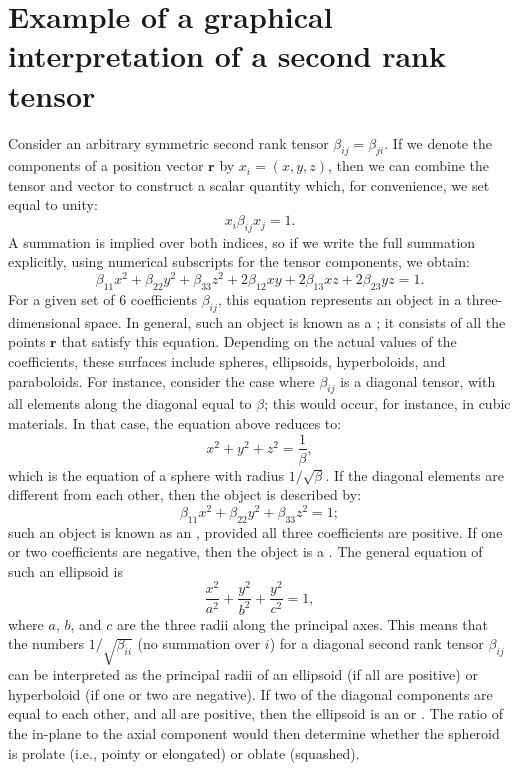 \section{Example of a graphical interpretation of a second rank tensor}\label{\chabbr:sec:tensorgraph}

Consider an arbitrary symmetric second rank tensor $\beta_{ij}=\beta_{ji}$.  If we denote the components of a position vector $\mathbf{r}$ by $x_i=(x,y,z)$, then we can combine the tensor and vector to construct a scalar quantity which, for convenience, we set equal to unity:
\[
	x_i\beta_{ij}x_j = 1.
\]
A summation is implied over both indices, so if we write the full summation explicitly, using numerical subscripts for the tensor components, we obtain:
\[
	\beta_{11}x^2+\beta_{22}y^2+\beta_{33}z^2 + 2\beta_{12}xy+2\beta_{13}xz+2\beta_{23}yz=1.
\]
For a given set of $6$ coefficients $\beta_{ij}$, this equation represents an object in a three-dimensional space.  In general, such an object is known as a ; it consists of all the points $\mathbf{r}$  that satisfy this equation.  Depending on the actual values of the coefficients, these surfaces include spheres, ellipsoids, hyperboloids, and paraboloids.  For instance, consider the case where $\beta_{ij}$ is a diagonal tensor, with all elements along the diagonal equal to $\beta$; this would occur, for instance, in cubic materials.  In that case, the equation above reduces to:
\[
	x^2 + y^2+z^2 = \frac{1}{\beta},
\]
which is the equation of a sphere with radius $1/\sqrt{\beta}$.  If the diagonal elements are different from each other, then the object is described by:
\[
	\beta_{11}x^2+\beta_{22}y^2+\beta_{33}z^2=1;
\]
such an object is known as an , provided all three coefficients are positive.  If one or two coefficients are negative, then the object is a .  The general equation of such an ellipsoid is
\[
	\frac{x^2}{a^2} + \frac{y^2}{b^2} + \frac{y^2}{c^2} = 1,
\]
where $a$, $b$, and $c$ are the three radii along the principal axes.  This means that the numbers $1/\sqrt{\beta_{ii}}$ (no summation over $i$) for a  diagonal second rank tensor $\beta_{ij}$ can be interpreted as the principal radii of an ellipsoid (if all are positive) or hyperboloid (if one or two are negative).  If two of the diagonal components are equal to each other, and all are positive, then the ellipsoid is an  or . The ratio of the in-plane to the axial component would then determine whether the spheroid is prolate (i.e., pointy or elongated) or oblate (squashed).


